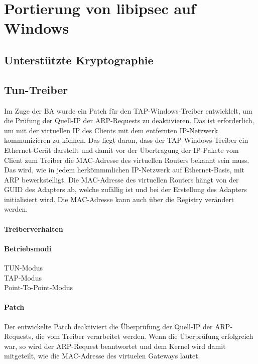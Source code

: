 \section{Portierung von libipsec auf Windows}
\subsection{Unterstützte Kryptographie}
\subsection{Tun-Treiber}
Im Zuge der \ac{BA} wurde ein Patch für den TAP-Windows-Treiber entwicklelt, um die
Prüfung der Quell-IP der ARP-Requests zu deaktivieren. Das ist erforderlich, um mit der
virtuellen IP des Clients mit dem entfernten IP-Netzwerk kommunizieren zu können.
Das liegt daran, dass der TAP-Windows-Treiber ein Ethernet-Gerät darstellt und damit
vor der Übertragung der IP-Pakete vom Client zum Treiber die MAC-Adresse des virtuellen Routers bekannt sein muss.
Das wird, wie in jedem herkömmmlichen IP-Netzwerk auf Ethernet-Basis, mit ARP bewerkstelligt.
Die MAC-Adresse des virtuellen Routers hängt von der GUID des Adapters ab, welche zufällig ist
und bei der Erstellung des Adapters initialisiert wird. Die MAC-Adresse kann auch über die Registry verändert werden.
\paragraph{Treiberverhalten}

\paragraph{Betriebsmodi}
\begin{description}
\item [TUN-Modus] 
\item [TAP-Modus]
\item [Point-To-Point-Modus]
\end{description}
\paragraph{Patch}
Der entwickelte Patch deaktiviert die Überprüfung der Quell-IP der ARP-Requests, die
vom Treiber verarbeitet werden. Wenn die Überprüfung erfolgreich war, so wird der ARP-Request
beantwortet und dem Kernel wird damit mitgeteilt, wie die MAC-Adresse des virtuelen Gateways lautet.

